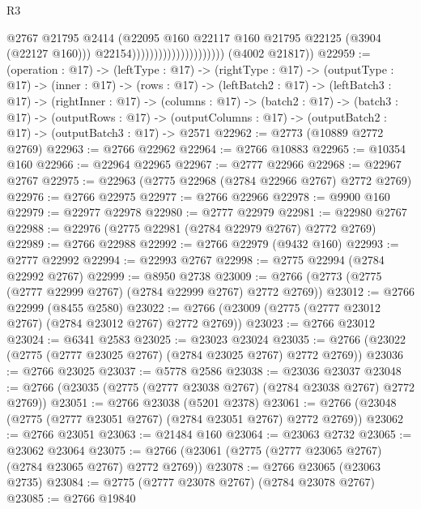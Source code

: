 \begin{lexlean}{R3}
\begin{coremodule}
                                                @2767
                                                @21795
                                                @2414
                                                (@22095
                                                  @160
                                                  @22117
                                                  @160
                                                  @21795
                                                  @22125
                                                  (@3904 (@22127 @160)))
                                                @22154)))))))))))))))))))))
      (@4002 @21817))
@22959 := (operation : @17) ->
  (leftType : @17) ->
  (rightType : @17) ->
  (outputType : @17) ->
  (inner : @17) ->
  (rows : @17) ->
  (leftBatch2 : @17) ->
  (leftBatch3 : @17) ->
  (rightInner : @17) ->
  (columns : @17) ->
  (batch2 : @17) ->
  (batch3 : @17) ->
  (outputRows : @17) ->
  (outputColumns : @17) -> (outputBatch2 : @17) -> (outputBatch3 : @17) -> @2571
@22962 := @2773 (@10889 @2772 @2769)
@22963 := @2766 @22962
@22964 := @2766 @10883
@22965 := @10354 @160
@22966 := @22964 @22965
@22967 := @2777 @22966
@22968 := @22967 @2767
@22975 := @22963 (@2775 @22968 (@2784 @22966 @2767) @2772 @2769)
@22976 := @2766 @22975
@22977 := @2766 @22966
@22978 := @9900 @160
@22979 := @22977 @22978
@22980 := @2777 @22979
@22981 := @22980 @2767
@22988 := @22976 (@2775 @22981 (@2784 @22979 @2767) @2772 @2769)
@22989 := @2766 @22988
@22992 := @2766 @22979 (@9432 @160)
@22993 := @2777 @22992
@22994 := @22993 @2767
@22998 := @2775 @22994 (@2784 @22992 @2767)
@22999 := @8950 @2738
@23009 := @2766 (@2773 (@2775 (@2777 @22999 @2767) (@2784 @22999 @2767) @2772 @2769))
@23012 := @2766 @22999 (@8455 @2580)
@23022 := @2766 (@23009 (@2775 (@2777 @23012 @2767) (@2784 @23012 @2767) @2772 @2769))
@23023 := @2766 @23012
@23024 := @6341 @2583
@23025 := @23023 @23024
@23035 := @2766 (@23022 (@2775 (@2777 @23025 @2767) (@2784 @23025 @2767) @2772 @2769))
@23036 := @2766 @23025
@23037 := @5778 @2586
@23038 := @23036 @23037
@23048 := @2766 (@23035 (@2775 (@2777 @23038 @2767) (@2784 @23038 @2767) @2772 @2769))
@23051 := @2766 @23038 (@5201 @2378)
@23061 := @2766 (@23048 (@2775 (@2777 @23051 @2767) (@2784 @23051 @2767) @2772 @2769))
@23062 := @2766 @23051
@23063 := @21484 @160
@23064 := @23063 @2732
@23065 := @23062 @23064
@23075 := @2766 (@23061 (@2775 (@2777 @23065 @2767) (@2784 @23065 @2767) @2772 @2769))
@23078 := @2766 @23065 (@23063 @2735)
@23084 := @2775 (@2777 @23078 @2767) (@2784 @23078 @2767)
@23085 := @2766 @19840

\end{coremodule}
\end{lexlean}
